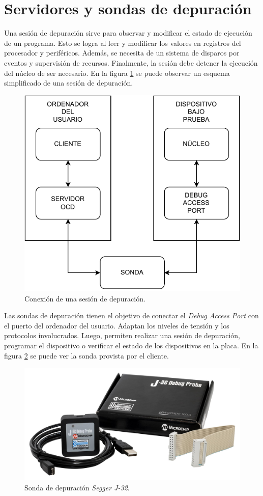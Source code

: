 \section{Servidores y sondas de depuración}
\label{sec:depuracion}

Una sesión de depuración sirve para observar y modificar el estado de ejecución de un programa.
Esto se logra al leer y modificar los valores en registros del procesador y periféricos.
Además, se necesita de un sistema de disparos por eventos y supervisión de recursos.
Finalmente, la sesión debe detener la ejecución del núcleo de ser necesario.
En la figura \ref{fig:debug} se puede observar un esquema simplificado de una sesión de depuración.

\begin{figure}[htbp]
	\centering
	\includegraphics[width=.8\textwidth]{./Figures/debug.pdf}
    \caption{Conexión de una sesión de depuración.}
	\label{fig:debug}
\end{figure}

\newpage

Las sondas de depuración tienen el objetivo de conectar el \emph{Debug Access Port} con el puerto del ordenador del usuario.
Adaptan los niveles de tensión y los protocolos involucrados.
Luego, permiten realizar una sesión de depuración, programar el dispositivo o verificar el estado de los dispositivos en la placa.
En la figura \ref{fig:sonda} se puede ver la sonda provista por el cliente.

\begin{figure}[htbp]
	\centering
	\includegraphics[width=.8\textwidth]{./Figures/segger.jpg}
    \caption{Sonda de depuración \emph{Segger J-32}\protect\footnotemark.}
	\label{fig:sonda}
\end{figure}


